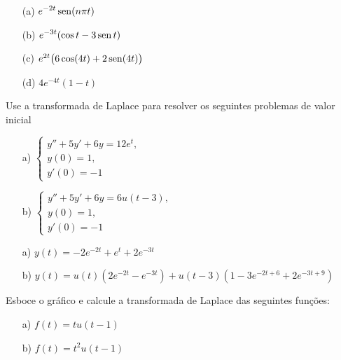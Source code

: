 \documentclass[Main.tex]{subfiles}
\begin{document}
\begin{Answer}
\begin{itemize}
\item[(a)] $\displaystyle e^{-2t} \operatorname{sen} (n\pi t)$
  \item[(b)] $\displaystyle e^{-3t} (\cos t - 3\operatorname{sen}  t)$
  \item[(c)] $e^{2t} \big(6\cos (4t) + 2 \operatorname{sen} (4t)\big)$
  \item[(d)] $\displaystyle 4e^{-4t} (1-t)$
\end{itemize}
  \end{Answer}

\begin{Exercise}Use a transformada de Laplace para resolver os seguintes problemas de valor inicial
\begin{itemize}
 \item[a)] $\displaystyle\left\{ \begin{array}{l}y''+5y'+6y=12e^t,\\ y(0)=1,\\y'(0)=-1 \end{array}\right.$
 \item[b)] $\displaystyle\left\{ \begin{array}{l}y''+5y'+6y=6u(t-3),\\ y(0)=1,\\y'(0)=-1 \end{array}\right.$
\end{itemize}

 
\end{Exercise}
\begin{Answer}
\begin{itemize}
 \item[a)] $y(t)=-2e^{-2t}+e^{t}+2e^{-3t}$
 \item[b)] $y(t)=u(t)\left(2e^{-2t}-e^{-3t}\right)+u(t-3)\left(1-3e^{-2t+6}+2e^{-3t+9}\right)$
\end{itemize}
 
\end{Answer}

\begin{Exercise}Esboce o gráfico e calcule a transformada de Laplace das seguintes funções:
 \begin{itemize}
  \item[a)] $f(t)=tu(t-1)$
  \item[b)] $f(t)=t^2u(t-1)$
 \end{itemize}

\end{Exercise}
\end{document}
